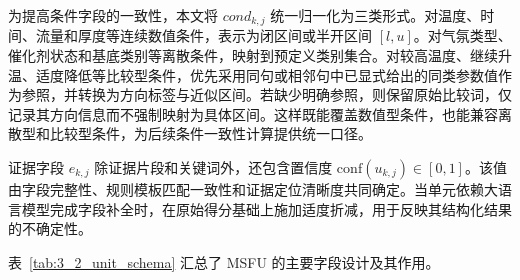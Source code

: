 为提高条件字段的一致性，本文将 $cond_{k,j}$ 统一归一化为三类形式。对温度、时间、流量和厚度等连续数值条件，表示为闭区间或半开区间 $[l,u]$。对气氛类型、催化剂状态和基底类别等离散条件，映射到预定义类别集合。对较高温度、继续升温、适度降低等比较型条件，优先采用同句或相邻句中已显式给出的同类参数值作为参照，并转换为方向标签与近似区间。若缺少明确参照，则保留原始比较词，仅记录其方向信息而不强制映射为具体区间。这样既能覆盖数值型条件，也能兼容离散型和比较型条件，为后续条件一致性计算提供统一口径。

证据字段 $e_{k,j}$ 除证据片段和关键词外，还包含置信度 $\mathrm{conf}(u_{k,j})\in[0,1]$。该值由字段完整性、规则模板匹配一致性和证据定位清晰度共同确定。当单元依赖大语言模型完成字段补全时，在原始得分基础上施加适度折减，用于反映其结构化结果的不确定性。

表~\ref{tab:3_2_unit_schema} 汇总了 MSFU 的主要字段设计及其作用。

\newcommand{\optcell}[2][3.2\baselineskip]{\parbox[c][#1][c]{\linewidth}{\centering #2}}

